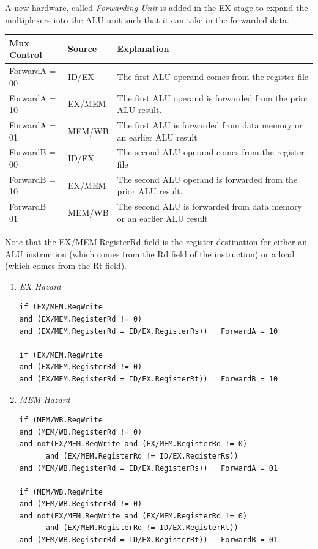 \documentclass[12pt]{article}
\theoremstyle{definition}
\begin{document}
  A new hardware, called \emph{Forwarding Unit} is added in the EX stage to expand the multiplexers into the ALU unit such that it can take in the forwarded data.
  \begin{center}
  \begin{tabular}{l | l | p{9cm}}
    Mux Control & Source & Explanation \\ \hline \hline
    ForwardA = 00 & ID/EX   & The first ALU operand comes from the register file \\ \hline
    ForwardA = 10 & EX/MEM  & The first ALU operand is forwarded from the prior ALU result. \\ \hline
    ForwardA = 01 & MEM/WB  & The first ALU is forwarded from data memory or an earlier ALU result \\ \hline
    ForwardB = 00 & ID/EX   & The second ALU operand comes from the register file \\ \hline
    ForwardB = 10 & EX/MEM  & The second ALU operand is forwarded from the prior ALU result. \\ \hline
    ForwardB = 01 & MEM/WB  & The second ALU is forwarded from data memory or an earlier ALU result \\ \hline
  \end{tabular}
  \end{center}
  Note that the EX/MEM.RegisterRd field is the register destination for either an ALU instruction (which comes from the Rd field of the instruction) or a load (which comes from the Rt field).
  \begin{enumerate}
    \item \emph{EX Hazard}
\begin{verbatim}
if (EX/MEM.RegWrite
and (EX/MEM.RegisterRd != 0)
and (EX/MEM.RegisterRd = ID/EX.RegisterRs))   ForwardA = 10

if (EX/MEM.RegWrite
and (EX/MEM.RegisterRd != 0)
and (EX/MEM.RegisterRd = ID/EX.RegisterRt))   ForwardB = 10
\end{verbatim}
    \item \emph{MEM Hazard}
\begin{verbatim}
if (MEM/WB.RegWrite
and (MEM/WB.RegisterRd != 0)
and not(EX/MEM.RegWrite and (EX/MEM.RegisterRd != 0)
      and (EX/MEM.RegisterRd != ID/EX.RegisterRs))
and (MEM/WB.RegisterRd = ID/EX.RegisterRs))   ForwardA = 01

if (MEM/WB.RegWrite
and (MEM/WB.RegisterRd != 0)
and not(EX/MEM.RegWrite and (EX/MEM.RegisterRd != 0)
      and (EX/MEM.RegisterRd != ID/EX.RegisterRt))
and (MEM/WB.RegisterRd = ID/EX.RegisterRt))   ForwardB = 01
\end{verbatim}
  \end{enumerate}
\end{document}

